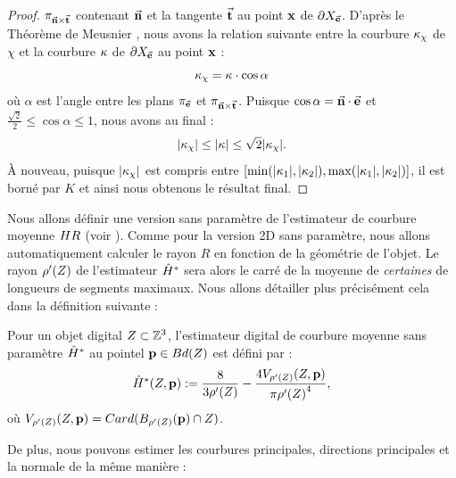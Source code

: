 \begin{proof}
  $\pi_{\vec{\mathbf{n}} \times \vec{\mathbf{t}}}$ contenant $\vec{\mathbf{n}}$ et la
  tangente $\vec{\mathbf{t}}$ au point $\mathbf{x}$ de $\partial X_{\vec{\mathbf{e}}}$. D'après le
  Théorème de Meusnier \cite{Berger1992}, nous avons la relation suivante entre la
  courbure $\kappa_\chi$ de $\chi$ et la courbure $\kappa$ de $\partial X_{\vec{\mathbf{e}}}$ au
  point $\mathbf{x}$ :
  \begin{equation}
    \kappa_\chi = \kappa \cdot \cos \alpha
  \end{equation}
  où $\alpha$ est l'angle entre les plans $\pi_{\vec{\mathbf{e}}}$ et
  $\pi_{\vec{\mathbf{n}} \times \vec{\mathbf{t}}}$. Puisque $\cos \alpha =
  \vec{\mathbf{n}} \cdot \vec{\mathbf{e}}$ et $\frac{\sqrt{2}}{2} \leq \cos \alpha \leq
  1 $, nous avons au final :
  \begin{equation}
    |\kappa_\chi| \le |\kappa| \le \sqrt{2}|\kappa_\chi|.
  \end{equation}
  À nouveau, puisque  $|\kappa_\chi|$ est compris entre $\lbrack
  \min(|\kappa_{1}|,|\kappa_{2}|),
  \max(|\kappa_{1}|,|\kappa_{2}|)\rbrack$,  il est borné par $K$ et ainsi
  nous obtenons le résultat final.
\end{proof}
%
Nous allons définir une version sans paramètre de l'estimateur de courbure
moyenne $H{R}$ (voir ).
Comme pour la version 2D sans paramètre, nous allons automatiquement calculer le
rayon $R$ en fonction de la géométrie de l'objet. Le rayon $\rho'(Z)$ de
l'estimateur $\hat{H}^{*}$ sera alors le carré de la moyenne de \emph{certaines}
de longueurs de segments maximaux. Nous allons détailler plus précisément cela
dans la définition suivante :
%
\begin{definition}
  Pour un objet digital $Z \subset \mathbb{Z}^3$, l'estimateur digital de
  courbure moyenne sans paramètre $\hat{H}^{*}$ au pointel $\mathbf{p} \in
  Bd({Z})$ est défini par :
  \begin{equation}
    \hat{H}^{*}( Z, \mathbf{p} ) := \frac{8}{3 {\rho'(Z)}} - \frac{4 V_{{\rho'(Z)}}(Z, \mathbf{p})}{\pi{{\rho'(\ensuremath{Z})}}^4} ,
    \label{def:curvature-estimator-3d-mean-pf}
  \end{equation}
  où $V_{\rho'(Z)}(Z, \mathbf{p}) = Card(B_{\rho'(Z)}(\mathbf{p}) \cap Z)$.
\end{definition}
%
De plus, nous pouvons estimer les courbures principales, directions principales
et la normale de la même manière :
%
